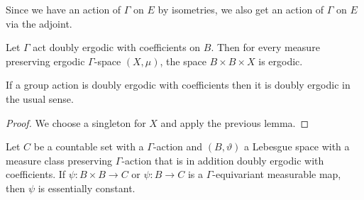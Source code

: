 \begin{rem}
  Since we have an action of \(\Gamma\) on \(E\) by isometries, we also get an action of \(\Gamma\) on \(E\) via the adjoint.
\end{rem}

\begin{lemma}
  \label{lem:coeff-product}
  Let \(\Gamma\) act doubly ergodic with coefficients on \(B\). Then for every measure preserving ergodic \(\Gamma\)-space \((X, \mu)\), the space \(B \times B \times X\) is ergodic.
\end{lemma}

\begin{cor}
  \label{cor:coeff-ergodic}
  If a group action is doubly ergodic with coefficients then it is doubly ergodic in the usual sense.
\end{cor}

\begin{proof}
  We choose a singleton for \(X\) and apply the previous lemma.
\end{proof}

\begin{lemma}[{\cite[Lemma~4.4]{MR3509968}}]
  \label{lem:4.4}
  Let \(C\) be a countable set with a \(\Gamma\)-action and \((B, \vartheta)\) a Lebesgue space with a measure class preserving \(\Gamma\)-action that is in addition doubly ergodic with coefficients. If \(\psi \colon B \times B \to C\) or \(\psi \colon B \to C\) is a \(\Gamma\)-equivariant measurable map, then \(\psi\) is essentially constant.
\end{lemma}


